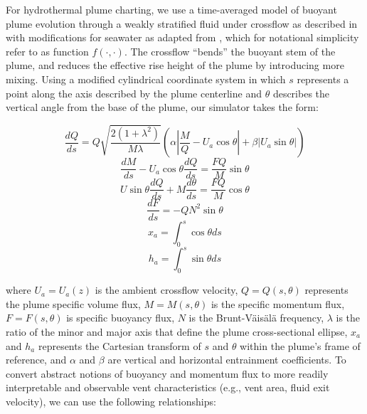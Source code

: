 For hydrothermal plume charting, we use a time-averaged model of buoyant plume evolution through a weakly stratified fluid under crossflow as described in \autocite{tohidi2016highly} with modifications for seawater as adapted from \autocite{xu2012deep}, which for notational simplicity refer to as function $f(\cdot, \cdot)$. The crossflow ``bends'' the buoyant stem of the plume, and reduces the effective rise height of the plume by introducing more mixing. Using a modified cylindrical coordinate system in which $s$ represents a point along the axis described by the plume centerline and $\theta$ describes the vertical angle from the base of the plume, our \PHUMES simulator takes the form:

\begin{equation}
    \frac{dQ}{ds} = Q\sqrt{\frac{2(1+\lambda^2)}{M\lambda}}(\alpha|\frac{M}{Q} - U_a\cos\theta| + \beta|U_a\sin\theta|)
\end{equation}
\begin{equation}
    \frac{dM}{ds} - U_a\cos\theta\frac{dQ}{ds} = \frac{FQ}{M}\sin\theta 
\end{equation}
\begin{equation}
    U\sin\theta\frac{dQ}{ds} + M\frac{d\theta}{ds} = \frac{FQ}{M}\cos\theta
\end{equation}
\begin{equation}
    \frac{dF}{ds} = -QN^2\sin\theta
\end{equation}
\begin{equation}
    x_a = \int_0^s\cos\theta ds
\end{equation}
\begin{equation}
    h_a = \int_0^s \sin\theta ds
\end{equation}

where $U_a = U_a(z)$ is the ambient crossflow velocity, $Q = Q(s,\theta)$ represents the plume specific volume flux, $M = M(s, \theta)$ is the specific momentum flux, $F = F(s, \theta)$ is specific buoyancy flux, $N$ is the Brunt-V\"ais\"al\"a frequency, $\lambda$ is the ratio of the minor and major axis that define the plume cross-sectional ellipse, $x_a$ and $h_a$ represents the Cartesian transform of $s$ and $\theta$ within the plume's frame of reference, and $\alpha$ and $\beta$ are vertical and horizontal entrainment coefficients. To convert abstract notions of buoyancy and momentum flux to more readily interpretable and observable vent characteristics (e.g., vent area, fluid exit velocity), we can use the following relationships:

